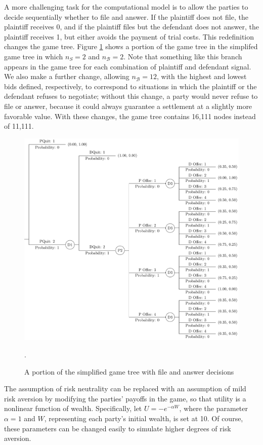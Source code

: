 \documentclass{article}
\begin{document}
A more challenging task for the computational model is to allow the parties to decide sequentially whether to file and answer. If the plaintiff does not file, the plaintiff receives 0, and if the plaintiff files but the defendant does not answer, the plaintiff receives 1, but either avoids the payment of trial costs. This redefinition changes the game tree. Figure \ref{fig:quittree} shows a portion of the game tree in the simplifed game tree in which $n_S=2$ and $n_{\mathcal{B}}=2$. Note that something like this branch appears in the game tree for each combination of plaintiff and defendant signal. We also make a further change, allowing $n_{\mathcal{B}}=12$, with the highest and lowest bids defined, respectively, to correspond to situations in which the plaintiff or the defendant refuses to negotiate; without this change, a party would never refuse to file or answer, because it could always guarantee a settlement at a slightly more favorable value. With these changes, the game tree contains 16,111 nodes instead of 11,111.

\begin{figure}[h!]
\centering
\includegraphics[scale=0.50, trim={0in 0in 0in 0in}, clip]{../Figures/quittree.pdf}
\caption{A portion of the simplified game tree with file and answer decisions}.
\label{fig:quittree}
\end{figure}

The assumption of risk neutrality can be replaced with an assumption of mild risk aversion by modifying the parties' payoffs in the game, so that utility is a nonlinear function of wealth. Specifically, let $U = -e^{-\alpha W}$, where the parameter $\alpha=1$ and $W$, representing each party's initial wealth, is set at 10. Of course, these parameters can be changed easily to simulate higher degrees of risk aversion.
\end{document}
